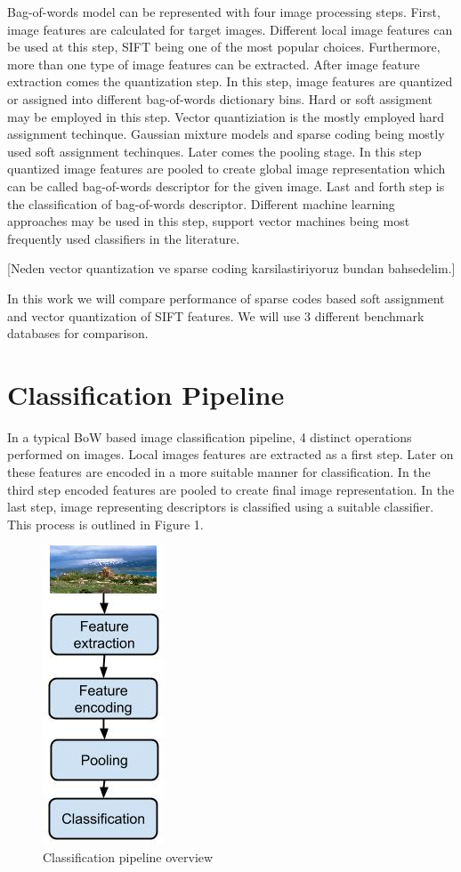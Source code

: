 \documentclass[conference]{IEEEtran}
\begin{document}
Bag-of-words model can be represented with four image processing steps. First, image features are calculated for target images. Different local image features can be used at this step, SIFT being one of the most popular choices. Furthermore, more than one type of image features can be extracted. After image feature extraction comes the quantization step. In this step, image features are quantized or assigned into different bag-of-words dictionary bins. Hard or soft assigment may be employed in this step. Vector quantiziation is the mostly employed hard assignment techinque. Gaussian mixture models and sparse coding being mostly used soft assignment techinques. Later comes the pooling stage. In this step quantized image features are pooled to create global image representation which can be called bag-of-words descriptor for the given image. Last and forth step is the classification of bag-of-words descriptor. Different machine learning approaches may be used in this step, support vector machines being most frequently used classifiers in the literature.

[Neden vector quantization ve sparse coding karsilastiriyoruz bundan bahsedelim.]

In this work we will compare performance of sparse codes based soft assignment and vector quantization of SIFT features. We will use 3 different benchmark databases for comparison.

\section {Classification Pipeline}

In a typical BoW based image classification pipeline, 4 distinct operations performed on images. Local images features are extracted as a first step. Later on these features are encoded in a more suitable manner for classification. In the third step encoded features are pooled to create final image representation. In the last step, image representing descriptors is classified using a suitable classifier. This process is outlined in Figure 1.

\begin{figure}[h]
\centering
\includegraphics[scale=0.5]{data/classification_pipeline.jpg}
\caption{Classification pipeline overview}
\label{figure1}
\end{figure}
\end{document}
